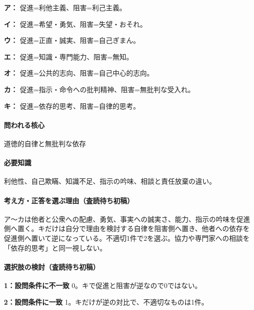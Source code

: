 \noindent\textbf{ア：} 促進=利他主義、阻害=利己主義。\par

\noindent\textbf{イ：} 促進=希望・勇気、阻害=失望・おそれ。\par

\noindent\textbf{ウ：} 促進=正直・誠実、阻害=自己ぎまん。\par

\noindent\textbf{エ：} 促進=知識・専門能力、阻害=無知。\par

\noindent\textbf{オ：} 促進=公共的志向、阻害=自己中心的志向。\par

\noindent\textbf{カ：} 促進=指示・命令への批判精神、阻害=無批判な受入れ。\par

\noindent\textbf{キ：} 促進=依存的思考、阻害=自律的思考。\par

\paragraph{問われる核心} 道徳的自律と無批判な依存

\paragraph{必要知識} 利他性、自己欺瞞、知識不足、指示の吟味、相談と責任放棄の違い。

\paragraph{考え方・正答を選ぶ理由（査読待ち初稿）} ア〜カは他者と公衆への配慮、勇気、事実への誠実さ、能力、指示の吟味を促進側へ置く。キだけは自分で理由を検討する自律を阻害側へ置き、他者への依存を促進側へ置いて逆になっている。不適切1件で2を選ぶ。協力や専門家への相談を「依存的思考」と同一視しない。

\paragraph{選択肢の検討（査読待ち初稿）}\mbox{}\par

\noindent\textbf{1：設問条件に不一致} 0。キで促進と阻害が逆なので0ではない。\par

\noindent\textbf{2：設問条件に一致} 1。キだけが逆の対比で、不適切なものは1件。\par

